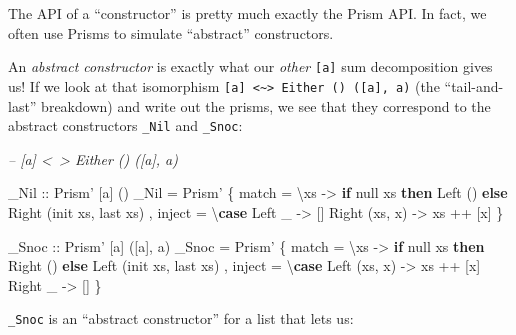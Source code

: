 \documentclass[]{article}
\newenvironment{Shaded}{}{}
\newcommand{\CommentTok}[1]{\textcolor[rgb]{0.38,0.63,0.69}{\textit{#1}}}
\newcommand{\DataTypeTok}[1]{\textcolor[rgb]{0.56,0.13,0.00}{#1}}
\newcommand{\FunctionTok}[1]{\textcolor[rgb]{0.02,0.16,0.49}{#1}}
\newcommand{\KeywordTok}[1]{\textcolor[rgb]{0.00,0.44,0.13}{\textbf{#1}}}
\newcommand{\NormalTok}[1]{#1}
\newcommand{\OtherTok}[1]{\textcolor[rgb]{0.00,0.44,0.13}{#1}}
\begin{document}
The API of a ``constructor'' is pretty much exactly the Prism API. In fact, we
often use Prisms to simulate ``abstract'' constructors.

An \emph{abstract constructor} is exactly what our \emph{other} \texttt{{[}a{]}}
sum decomposition gives us! If we look at that isomorphism
\texttt{{[}a{]}\ \textless{}\textasciitilde{}\textgreater{}\ Either\ ()\ ({[}a{]},\ a)}
(the ``tail-and-last'' breakdown) and write out the prisms, we see that they
correspond to the abstract constructors \texttt{\_Nil} and \texttt{\_Snoc}:

\begin{Shaded}
\begin{Highlighting}[]
\CommentTok{-- [a] <~> Either () ([a], a)}

\OtherTok{_Nil ::} \DataTypeTok{Prism'}\NormalTok{ [a] ()}
\NormalTok{_Nil }\FunctionTok{=} \DataTypeTok{Prism'}\NormalTok{ \{ match  }\FunctionTok{=}\NormalTok{ \textbackslash{}xs }\OtherTok{->} \KeywordTok{if}\NormalTok{ null xs}
                                  \KeywordTok{then} \DataTypeTok{Left}\NormalTok{  ()}
                                  \KeywordTok{else} \DataTypeTok{Right}\NormalTok{ (init xs, last xs)}
\NormalTok{              , inject }\FunctionTok{=}\NormalTok{ \textbackslash{}}\KeywordTok{case} \DataTypeTok{Left}\NormalTok{ _        }\OtherTok{->}\NormalTok{ []}
                               \DataTypeTok{Right}\NormalTok{ (xs, x) }\OtherTok{->}\NormalTok{ xs }\FunctionTok{++}\NormalTok{ [x]}
\NormalTok{              \}}

\OtherTok{_Snoc ::} \DataTypeTok{Prism'}\NormalTok{ [a] ([a], a)}
\NormalTok{_Snoc }\FunctionTok{=} \DataTypeTok{Prism'}\NormalTok{ \{ match  }\FunctionTok{=}\NormalTok{ \textbackslash{}xs }\OtherTok{->} \KeywordTok{if}\NormalTok{ null xs}
                                   \KeywordTok{then} \DataTypeTok{Right}\NormalTok{ ()}
                                   \KeywordTok{else} \DataTypeTok{Left}\NormalTok{  (init xs, last xs)}
\NormalTok{               , inject }\FunctionTok{=}\NormalTok{ \textbackslash{}}\KeywordTok{case} \DataTypeTok{Left}\NormalTok{  (xs, x) }\OtherTok{->}\NormalTok{ xs }\FunctionTok{++}\NormalTok{ [x]}
                                \DataTypeTok{Right}\NormalTok{ _       }\OtherTok{->}\NormalTok{ []}
\NormalTok{               \}}
\end{Highlighting}
\end{Shaded}

\texttt{\_Snoc} is an ``abstract constructor'' for a list that lets us:
\end{document}
